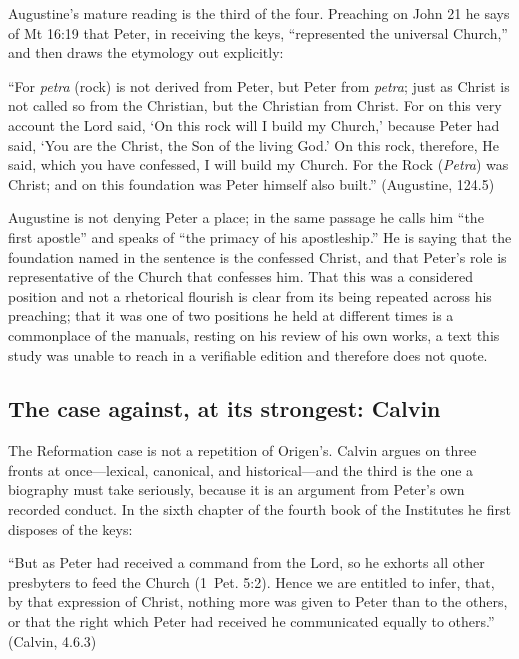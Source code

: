 Augustine's mature reading is the third of the four. Preaching on John 21 he
says of Mt 16:19 that Peter, in receiving the keys, ``represented the
universal Church,'' and then draws the etymology out explicitly:

\begin{studyframe}\small
``For \textit{petra} (rock) is not derived from Peter, but Peter from
\textit{petra}; just as Christ is not called so from the Christian, but the
Christian from Christ. For on this very account the Lord said, `On this rock
will I build my Church,' because Peter had said, `You are the Christ, the
Son of the living God.' On this rock, therefore, He said, which you have
confessed, I will build my Church. For the Rock (\textit{Petra}) was Christ;
and on this foundation was Peter himself also built.'' (Augustine,
 124.5)
\end{studyframe}

Augustine is not denying Peter a place; in the same passage he calls him
``the first apostle'' and speaks of ``the primacy of his apostleship.'' He is
saying that the foundation named in the sentence is the confessed Christ, and
that Peter's role is representative of the Church that confesses him. That
this was a considered position and not a rhetorical flourish is clear from
its being repeated across his preaching; that it was one of two positions he
held at different times is a commonplace of the manuals, resting on his
review of his own works, a text this study was unable to reach in a
verifiable edition and therefore does not quote.

\subsection{The case against, at its strongest: Calvin}

The Reformation case is not a repetition of Origen's. Calvin argues on three
fronts at once---lexical, canonical, and historical---and the third is the
one a biography must take seriously, because it is an argument from Peter's
own recorded conduct. In the sixth chapter of the fourth book of the
Institutes he first disposes of the keys:

\begin{studyframe}\small
``But as Peter had received a command from the Lord, so he exhorts all other
presbyters to feed the Church (1~Pet. 5:2). Hence we are entitled to infer,
that, by that expression of Christ, nothing more was given to Peter than to
the others, or that the right which Peter had received he communicated
equally to others.'' (Calvin,  4.6.3)
\end{studyframe}


